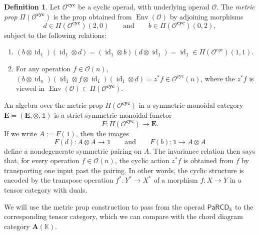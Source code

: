 \documentclass{amsart}
\newcommand{\bE}{\mathbf{E}}
\newcommand{\bA}{\mathbf{A}}
\newcommand{\calO}{\mathcal{O}}
\newcommand{\kk}{\mathbb{K}}    %
\newcommand{\PaRCD}{\mathsf{PaRCD}}
\newcommand{\hPaRCD}{{\PaRCD}_{\kk}}
\newcommand{\cyc}{\mathbf{cyc}}
\newcommand{\id}{\operatorname{id}}
\newcommand{\Env}{\operatorname{Env}}
\newcommand{\lrar}{\ensuremath{\longrightarrow}}
\theoremstyle{definition}
\newtheorem{definition}[theorem]{Definition}%
\numberwithin{equation}{section}
\begin{document}
\begin{definition}
Let $\calO^{\cyc}$ be a cyclic operad, with underlying operad $\calO$. The \emph{metric prop} $\Pi(\calO^{\cyc})$ is the prop obtained from $\Env(\calO)$ by adjoining morphisms
\[
d\in \Pi(\calO^{\cyc})(2,0)
\qquad \text{and} \qquad
b\in \Pi(\calO^{\cyc})(0,2),
\]
subject to the following relations:
\begin{enumerate}
    \item $(b \otimes \id_1)(\id_1 \otimes d) = (\id_1 \otimes b) (d \otimes \id_1) = \id_1 \in \Pi(\calO^{cyc})(1,1)$. \label{eq:zig-zag}
    \item For any operation $f\in \calO(n)$, $(b\otimes \id_n)(\id_1 \otimes f \otimes \id_1) (\id_1 \otimes d) = z^* f \in \calO^{\text{cyc}}(n)$, where the $z^* f$ is viewed in $\Env(\calO)\subset \Pi(\calO^{\cyc})$.
\end{enumerate}

\end{definition} 


An algebra over the metric prop $\Pi(\calO^{\cyc})$ in a symmetric monoidal category $\bE=(\bE, \otimes, \mathbb{1})$ is a strict symmetric monoidal functor
\[
F\colon \Pi(\calO^{\cyc}) \to \bE.
\]
If we write $A:=F(1)$, then the images
\[
F(d)\colon A\otimes A\to \mathbb{1}
\qquad \text{and} \qquad
F(b)\colon \mathbb{1}\to A\otimes A
\]
define a nondegenerate symmetric pairing on $A$. The invariance relation then says that, for every operation $f\in \calO(n)$, the cyclic action $z^*f$ is obtained from $f$ by transporting one input past the pairing. In other words, the cyclic structure is encoded by the transpose operation $f^*: Y^* \lrar X^*$ of a morphism $f: X \lrar Y$ in a tensor category with duals.

We will use the metric prop construction to pass from the operad $\hPaRCD$ to the corresponding tensor category, which we can compare with the chord diagram category $\bA(\kk)$. 
\end{document}
